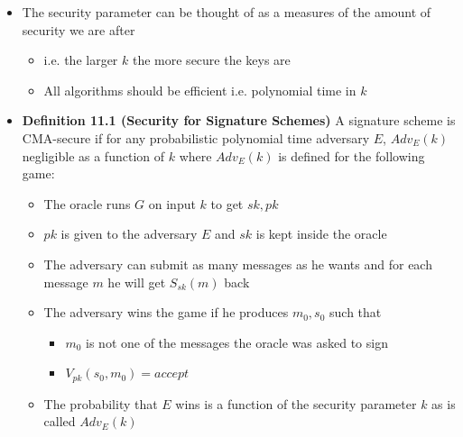 \begin{itemize}
  \item The security parameter can be thought of as a measures of the amount of security we are after
  \begin{itemize}
  	\item i.e. the larger $k$ the more secure the keys are
  	\item All algorithms should be efficient i.e. polynomial time in $k$
  \end{itemize}
  \item \textbf{Definition 11.1 (Security for Signature Schemes)} A signature scheme is CMA-secure if for any probabilistic polynomial time adversary $E$, $Adv_{E}(k)$ negligible as a function of $k$ where $Adv_{E}(k)$ is defined for the following game:
  \begin{itemize}
  	\item The oracle runs $G$ on input $k$ to get $sk,pk$
  	\item $pk$ is given to the adversary $E$ and $sk$ is kept inside the oracle
  	\item The adversary can submit as many messages as he wants and for each message $m$ he will get $S_{sk}(m)$ back
  	\item The adversary wins the game if he produces $m_0,s_0$ such that
    \begin{itemize}
  		\item $m_0$ is not one of the messages the oracle was asked to sign
  		\item $V_{pk}(s_0,m_0) = accept$
    \end{itemize}
  	\item The probability that $E$ wins is a function of the security parameter $k$ as is called $Adv_{E}(k)$
  \end{itemize}
\end{itemize}

